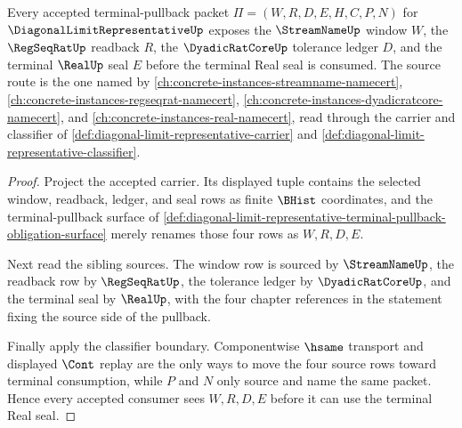 \begin{theorem}
\label{thm:diagonal-limit-representative-terminal-pullback-source-coverage}
Every accepted terminal-pullback packet $\Pi=(W,R,D,E,H,C,P,N)$ for $\DiagonalLimitRepresentativeUp$ exposes the $\StreamNameUp$ window $W$, the $\RegSeqRatUp$ readback $R$, the $\DyadicRatCoreUp$ tolerance ledger $D$, and the terminal $\RealUp$ seal $E$ before the terminal Real seal is consumed. The source route is the one named by \autoref{ch:concrete-instances-streamname-namecert}, \autoref{ch:concrete-instances-regseqrat-namecert}, \autoref{ch:concrete-instances-dyadicratcore-namecert}, and \autoref{ch:concrete-instances-real-namecert}, read through the carrier and classifier of \autoref{def:diagonal-limit-representative-carrier} and \autoref{def:diagonal-limit-representative-classifier}.
\end{theorem}
\begin{proof}
Project the accepted carrier. Its displayed tuple contains the selected window, readback, ledger, and seal rows as finite $\BHist$ coordinates, and the terminal-pullback surface of \autoref{def:diagonal-limit-representative-terminal-pullback-obligation-surface} merely renames those four rows as $W,R,D,E$.

Next read the sibling sources. The window row is sourced by $\StreamNameUp$, the readback row by $\RegSeqRatUp$, the tolerance ledger by $\DyadicRatCoreUp$, and the terminal seal by $\RealUp$, with the four chapter references in the statement fixing the source side of the pullback.

Finally apply the classifier boundary. Componentwise $\hsame$ transport and displayed $\Cont$ replay are the only ways to move the four source rows toward terminal consumption, while $P$ and $N$ only source and name the same packet. Hence every accepted consumer sees $W,R,D,E$ before it can use the terminal Real seal.
\end{proof}

